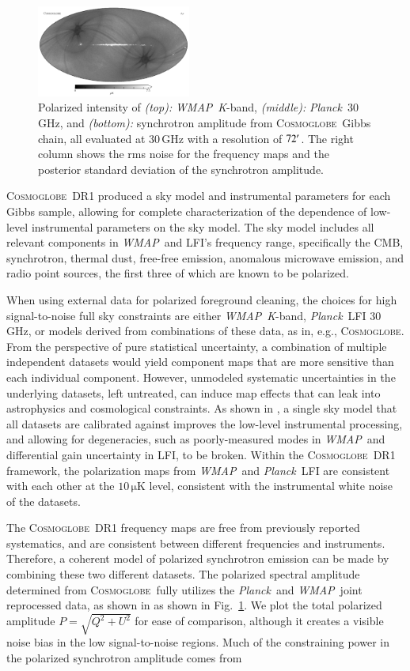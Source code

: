 \documentclass[twocolumn]{../../common/aa}
\def\WMAP{\emph{WMAP}}
\def\Planck{\emph{Planck}}
\newcommand{\cosmoglobe}{\textsc{Cosmoglobe}}
\newcommand{\K}[0]{\textit K}
\begin{document}
\begin{figure}
	\includegraphics[width=0.45\textwidth]{figures/polint_CG_sigma.pdf}
	\caption{
		Polarized intensity of \textit{(top):} \WMAP\ \K-band, \textit{(middle):} \Planck\ 30\,GHz, and \textit{(bottom):} synchrotron amplitude from \cosmoglobe\ Gibbs chain, all evaluated at 30\,GHz with a resolution of $72\arcm$. The right column shows the rms noise for the frequency maps and the posterior standard deviation of the synchrotron amplitude.
		}
       \label{fig:synch_polint}
\end{figure}


\cosmoglobe\ DR1 produced a sky model and instrumental parameters for each Gibbs sample, allowing for complete characterization of the dependence of low-level instrumental parameters on the sky model. The sky model includes all relevant components in \WMAP\ and LFI's frequency range, specifically the CMB, synchrotron, thermal dust, free-free emission, anomalous microwave emission, and radio point sources, the first three of which are known to be polarized. 

When using external data for polarized foreground cleaning, the choices for high signal-to-noise full sky constraints are either \WMAP\ \K-band, \Planck\ LFI 30\,GHz, or models derived from combinations of these data, as in, e.g., \cosmoglobe. From the perspective of pure statistical uncertainty, a combination of multiple independent datasets would yield component maps that are more sensitive than each individual component. However, unmodeled systematic uncertainties in the underlying datasets, left untreated, can induce map effects that can leak into astrophysics and cosmological constraints.
As shown in \citet{watts2023_dr1}, a single sky model that all datasets are calibrated against improves the low-level instrumental processing, and allowing for degeneracies, such as poorly-measured modes in \WMAP\ and differential gain uncertainty in LFI, to be broken. Within the \cosmoglobe\ DR1 framework, the polarization maps from \WMAP\ and \Planck\ LFI are consistent with each other at the $10\,\mathrm{\mu K}$ level, consistent with the instrumental white noise of the datasets.

The \cosmoglobe\ DR1 frequency maps are free from previously reported systematics, and are consistent between different frequencies and instruments. Therefore, a coherent model of polarized synchrotron emission can be made by combining these two different datasets.
The polarized spectral amplitude determined from \cosmoglobe\ fully utilizes the \Planck\ and \WMAP\ joint reprocessed data, as shown in as shown in Fig.~\ref{fig:synch_polint}. 
We plot the total polarized amplitude $P=\sqrt{Q^2+U^2}$ for ease of comparison, although it creates a visible noise bias in the low signal-to-noise regions. Much of the constraining power in the polarized synchrotron amplitude comes from 
\end{document}
